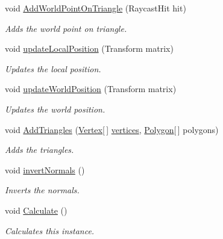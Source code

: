 \begin{DoxyCompactItemize}
void \hyperlink{class_lerp2_a_p_i_1_1_utility_1_1_c_s_g_1_1_triangulation_a3ab7d5c612f32d45f73cc8b09207abd8}{Add\+World\+Point\+On\+Triangle} (Raycast\+Hit hit)
\begin{DoxyCompactList}\small\item\em Adds the world point on triangle. \end{DoxyCompactList}\item 
void \hyperlink{class_lerp2_a_p_i_1_1_utility_1_1_c_s_g_1_1_triangulation_aa9f7332aa784967776e8f42b351860bd}{update\+Local\+Position} (Transform matrix)
\begin{DoxyCompactList}\small\item\em Updates the local position. \end{DoxyCompactList}\item 
void \hyperlink{class_lerp2_a_p_i_1_1_utility_1_1_c_s_g_1_1_triangulation_a95a7dc406590c28784f988a5b2320f7d}{update\+World\+Position} (Transform matrix)
\begin{DoxyCompactList}\small\item\em Updates the world position. \end{DoxyCompactList}\item 
void \hyperlink{class_lerp2_a_p_i_1_1_utility_1_1_c_s_g_1_1_triangulation_a943ef9b073f8bbbeeff53ec7fad7e0c8}{Add\+Triangles} (\hyperlink{class_lerp2_a_p_i_1_1_utility_1_1_c_s_g_1_1_triangulation_1_1_vertex}{Vertex}\mbox{[}$\,$\mbox{]} \hyperlink{class_lerp2_a_p_i_1_1_utility_1_1_c_s_g_1_1_triangulation_adcd2220db9df1a641a9504be92211497}{vertices}, \hyperlink{class_lerp2_a_p_i_1_1_utility_1_1_c_s_g_1_1_triangulation_1_1_polygon}{Polygon}\mbox{[}$\,$\mbox{]} polygons)
\begin{DoxyCompactList}\small\item\em Adds the triangles. \end{DoxyCompactList}\item 
void \hyperlink{class_lerp2_a_p_i_1_1_utility_1_1_c_s_g_1_1_triangulation_ac16e0f77d4c605188270f6199db42214}{invert\+Normals} ()
\begin{DoxyCompactList}\small\item\em Inverts the normals. \end{DoxyCompactList}\item 
void \hyperlink{class_lerp2_a_p_i_1_1_utility_1_1_c_s_g_1_1_triangulation_ad796ba657ef661bcd0dd83a9e724a88e}{Calculate} ()
\begin{DoxyCompactList}\small\item\em Calculates this instance. \end{DoxyCompactList}\end{DoxyCompactItemize}
